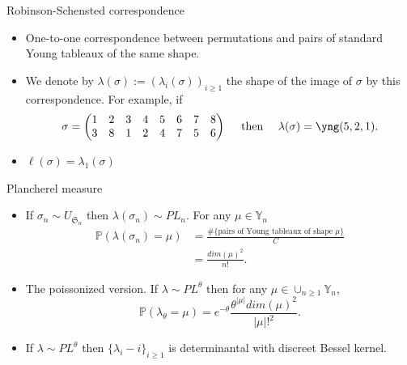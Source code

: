 \documentclass[english]{beamer}
\begin{document}
\begin{frame}{Robinson-Schensted correspondence}
\begin{itemize}
 
    \item One-to-one correspondence between permutations and pairs of standard Young tableaux of the same shape. 
    \item We denote by $\lambda(\sigma):=(\lambda_i(\sigma))_{i\geq1}$ the shape of the image of  $\sigma$ by this correspondence. 
    For example, if $$\sigma = \begin{pmatrix} 
1 & 2 & 3 & 4 & 5 & 6 & 7 & 8 \\
3 & 8 & 1 & 2 & 4 & 7 & 5 & 6
  \end{pmatrix}  \quad \text { then } \quad \lambda(\sigma)=\yng(5,2,1).$$ 

    \item $\ell(\sigma)=\lambda_1(\sigma)$
\end{itemize}    
\end{frame}

\begin{frame}{Plancherel measure}
\vspace{4 mm}

\begin{itemize}
    \item If $\sigma_n \sim {U}_{\mathfrak{S}_n}$ then $ \lambda(\sigma_n) \sim PL_n$. For any $\mu \in \mathbb{Y}_n$
    \begin{align*}
    \mathbb{P}(\lambda(\sigma_n)=\mu)&=\frac{\#\{\text{pairs of Young tableaux of shape } \mu\}}{C}\\&=\frac{dim(\mu)^2}{n!}. 
    \end{align*}
    \item The poissonized version. If $ \lambda \sim PL^\theta$ then  for any $\mu \in \cup_{n\geq 1}\mathbb{Y}_n$,
$$    \mathbb{P}(\lambda_\theta=\mu) = e^{-\theta}\frac{\theta^{|\mu|}dim(\mu)^2}{|\mu|!^2}.$$
\item  If  $\lambda \sim PL^\theta$ then $\{\lambda_i-i\}_{i\geq1}$ is determinantal with discreet Bessel kernel. 
\end{itemize}

\end{frame}
\end{document}

